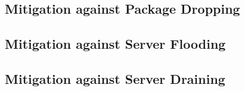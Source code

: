 \subsection{Mitigation against Package Dropping}
\subsection{Mitigation against Server Flooding}
\subsection{Mitigation against Server Draining}